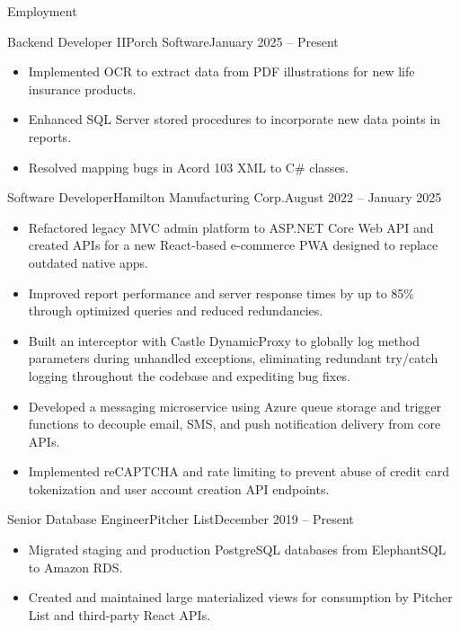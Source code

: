 \documentclass[calibri]{mcdowellcv}
\begin{document}
	\makeheader
	
	\begin{cvsection}{Employment}
		\begin{cvsubsection}{Backend Developer II}{Porch Software}{January 2025 -- Present}
			\begin{itemize}
				\item Implemented OCR to extract data from PDF illustrations for new life insurance products.
				\item Enhanced SQL Server stored procedures to incorporate new data points in reports.
				\item Resolved mapping bugs in Acord 103 XML to C\# classes.
			\end{itemize}
		\end{cvsubsection}
		\begin{cvsubsection}{Software Developer}{Hamilton Manufacturing Corp.}{August 2022 -- January 2025}
			\begin{itemize}
				\item Refactored legacy MVC admin platform to ASP.NET Core Web API and created APIs for a new React-based e-commerce PWA designed to replace outdated native apps. 
				\item Improved report performance and server response times by up to 85\% through optimized queries and reduced redundancies.
				\item Built an interceptor with Castle DynamicProxy to globally log method parameters during unhandled exceptions, eliminating redundant try/catch logging throughout the codebase and expediting bug fixes.
				\item Developed a messaging microservice using Azure queue storage and trigger functions to decouple email, SMS, and push notification delivery from core APIs.
				\item Implemented reCAPTCHA and rate limiting to prevent abuse of credit card tokenization and user account creation API endpoints.
			\end{itemize}
		\end{cvsubsection}
		\begin{cvsubsection}{Senior Database Engineer}{Pitcher List}{December 2019 -- Present}
			\begin{itemize}
				\item Migrated staging and production PostgreSQL databases from ElephantSQL to Amazon RDS.
				\item Created and maintained large materialized views for consumption by Pitcher List and third-party React APIs.

\end{itemize}
\end{cvsubsection}
\end{cvsection}
\end{document}
